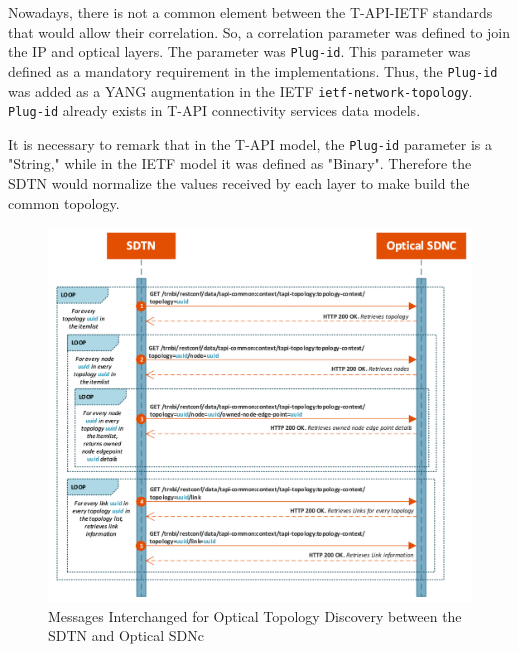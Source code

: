 \documentclass[a4paper,fleqn]{cas-dc}
\begin{document}
Nowadays, there is not a common element between the T-API-IETF standards that would allow their correlation. So, a correlation parameter was defined to join the IP and optical layers. The parameter was \texttt{Plug-id}. This parameter was defined as a mandatory requirement in the implementations.  Thus, the \texttt{Plug-id} was added as a YANG augmentation in the IETF \texttt{ietf-network-topology}. \texttt{Plug-id} already exists in T-API connectivity services data models. 

It is necessary to remark that in the T-API model, the \texttt{Plug-id} parameter is a "String," while in the IETF model it was defined as "Binary". Therefore the SDTN would normalize the values received by each layer to make build the common topology.

\begin{figure}
	\centering
		\includegraphics[width=\linewidth]{figs/optical_topology_workflow_2.png}
	\caption{Messages Interchanged for Optical Topology Discovery between the SDTN and Optical SDNc}
	\label{FIG:optical_topology_workflow}
\end{figure}
\end{document}
